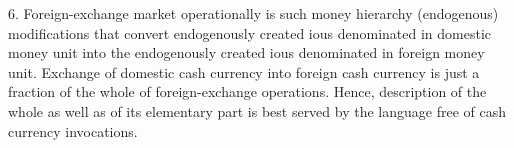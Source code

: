 6. Foreign-exchange market operationally is such money hierarchy (endogenous) modifications that convert endogenously created \acsp{iou} denominated in domestic money unit into the endogenously created \acsp{iou} denominated in foreign money unit. Exchange of domestic cash currency into foreign cash currency is just a fraction of the whole of foreign-exchange operations. Hence, description of the whole as well as of its elementary part is best served by the language free of cash currency invocations.
